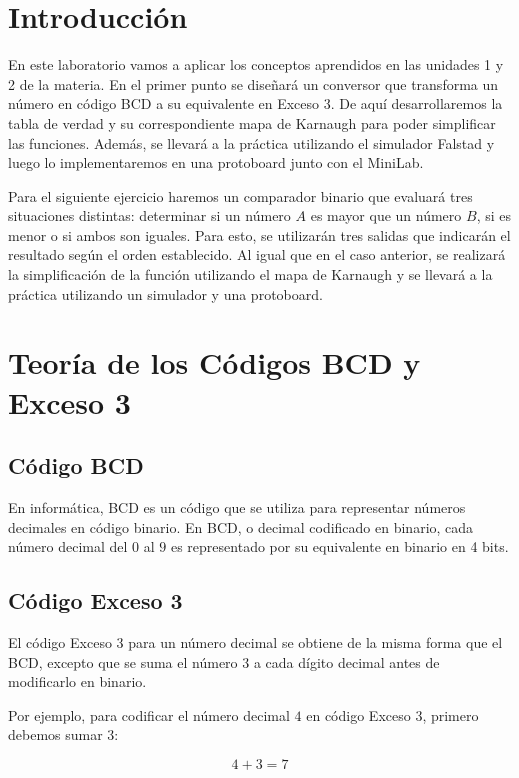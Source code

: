 \documentclass[a4paper,12pt]{article}
\begin{document}
	
	\section{Introducción}
	
	En este laboratorio vamos a aplicar los conceptos aprendidos en las unidades 1 y 2 de la materia. En el primer punto se diseñará un conversor que transforma un número en código BCD a su equivalente en Exceso 3. De aquí desarrollaremos la tabla de verdad y su correspondiente mapa de Karnaugh para poder simplificar las funciones. Además, se llevará a la práctica utilizando el simulador Falstad y luego lo implementaremos en una protoboard junto con el MiniLab.
	
	Para el siguiente ejercicio haremos un comparador binario que evaluará tres situaciones distintas: determinar si un número $A$ es mayor que un número $B$, si es menor o si ambos son iguales. Para esto, se utilizarán tres salidas que indicarán el resultado según el orden establecido. Al igual que en el caso anterior, se realizará la simplificación de la función utilizando el mapa de Karnaugh y se llevará a la práctica utilizando un simulador y una protoboard.
	
	\section{Teoría de los Códigos BCD y Exceso 3}
	
	\subsection{Código BCD}
	
	En informática, BCD es un código que se utiliza para representar números decimales en código binario. En BCD, o decimal codificado en binario, cada número decimal del $0$ al $9$ es representado por su equivalente en binario en 4 bits.
	
	\subsection{Código Exceso 3}
	
	El código Exceso 3 para un número decimal se obtiene de la misma forma que el BCD, excepto que se suma el número $3$ a cada dígito decimal antes de modificarlo en binario.
	
	Por ejemplo, para codificar el número decimal $4$ en código Exceso 3, primero debemos sumar $3$:
	
	\[
	4 + 3 = 7
	\]
	
\end{document}
